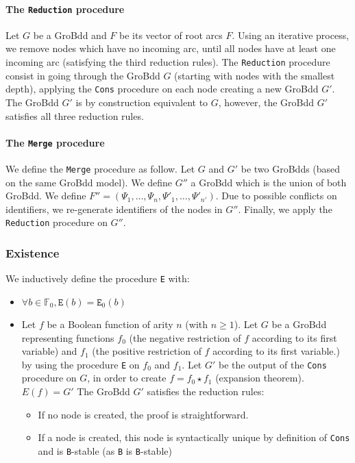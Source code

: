 \documentclass[a4paper,10pt]{article}
\newcommand{\F}{\mathbb{F}}%
\begin{document}
\paragraph{The \texttt{Reduction} procedure\\}
Let $G$ be a GroBdd and $F$ be its vector of root arcs $F$.
Using an iterative process, we remove nodes which have no incoming arc, until all nodes have at least one incoming arc (satisfying the third reduction rules).
The \texttt{Reduction} procedure consist in going through the GroBdd $G$ (starting with nodes with the smallest depth), applying the \texttt{Cons} procedure on each node creating a new GroBdd $G'$.
The GroBdd $G'$ is by construction equivalent to $G$, however, the GroBdd $G'$ satisfies all three reduction rules.

\paragraph{The \texttt{Merge} procedure\\}
We define the \texttt{Merge} procedure as follow.
Let $G$ and $G'$ be two GroBdds (based on the same GroBdd model).
We define $G''$ a GroBdd which is the union of both GroBdd.
We define $F'' = (\Psi_1, \dots, \Psi_n, \Psi'_1, \dots, \Psi'_{n'})$.
Due to possible conflicts on identifiers, we re-generate identifiers of the nodes in $G''$.
Finally, we apply the \texttt{Reduction} procedure on $G''$.

\subsubsection{Existence}
We inductively define the procedure \texttt{E} with:\begin{itemize}
\item $\forall b\in\F_0, \texttt{E}(b) = \texttt{E}_0(b)$
\item
Let $f$ be a Boolean function of arity $n$ (with $n \geq 1$).
Let $G$ be a GroBdd representing functions $f_0$ (the negative restriction of $f$ according to its first variable) and $f_1$ (the positive restriction of $f$ according to its first variable.) by using the procedure \texttt{E} on $f_0$ and $f_1$.
Let $G'$ be the output of the \texttt{Cons} procedure on $G$, in order to create $f = f_0 \star f_1$ (expansion theorem).\\
$E(f) = G'$
The GroBdd $G'$ satisfies the reduction rules:\begin{itemize}
\item If no node is created, the proof is straightforward.
\item If a node is created, this node is syntactically unique by definition of \texttt{Cons} and is \texttt{B}-stable  (as \texttt{B} is \texttt{B}-stable)
\end{itemize}
\end{itemize}
\end{document}
